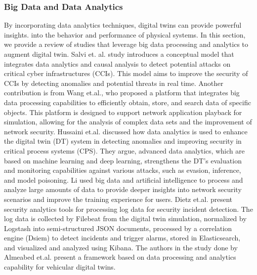 \subsubsection{Big Data and Data Analytics}
By incorporating data analytics techniques, digital twins can provide powerful insights\cite{li}. into the behavior and performance of physical systems. In this section, we provide a review of studies that leverage big data processing and analytics to augment digital twin.  
Salvi et. al.\cite{salviCyberresilienceCriticalCyber2022} study introduces a conceptual model that integrates data analytics and causal analysis to detect potential attacks on critical cyber infrastructures (CCIs). This model aims to improve the security of CCIs by detecting anomalies and potential threats in real time. 
Another contribution is from Wang et.al.\cite{wangDTCPNDigitalTwin2022}, who proposed a platform that integrates big data processing capabilities to efficiently obtain, store, and search data of specific objects. This platform is designed to support network application playback for simulation, allowing for the analysis of complex data sets and the improvement of network security. Hussaini et.al.\cite{hussainiTaxonomySecurityDefense2022} discussed how data analytics is used to enhance the digital twin (DT) system in detecting anomalies and improving security in critical process systems (CPS). They argue, advanced data analytics, which are based on machine learning and deep learning, strengthens the DT's evaluation and monitoring capabilities against various attacks, such as evasion, inference, and model poisoning. 
Li \cite{jiaqiliSpaceSpiderHyper2022} used big data and artificial intelligence to process and analyze large amounts of data to provide deeper insights into network security scenarios and improve the training experience for users.  
Dietz et.al. \cite{dietzIntegratingDigitalTwin2020} present security analytics tools for processing log data for security incident detection. The log data is collected by Filebeat from the digital twin simulation, normalized by Logstash into semi-structured JSON documents, processed by a correlation engine (Dsiem) to detect incidents and trigger alarms, stored in Elasticsearch, and visualized and analyzed using Kibana. The authors in the study done by Almeabed et.al.\cite{almeaibedDigitalTwinAnalysis2021} present a framework based on data processing and analytics capability for vehicular digital twins.  
